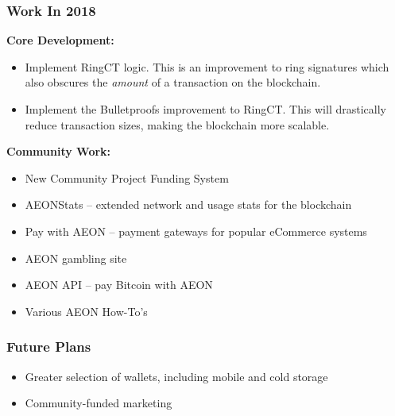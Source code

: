 \subsubsection{Work In 2018}
\textbf{Core Development:}
\begin{itemize}
	\item Implement RingCT logic. This is an improvement to ring signatures which also obscures the \textit{amount} of a transaction on the blockchain.
	\item Implement the Bulletproofs improvement to RingCT. This will drastically reduce transaction sizes, making the blockchain more scalable.
\end{itemize}
\textbf{Community Work:}
\begin{itemize}
	\item New Community Project Funding System
	\item AEONStats -- extended network and usage stats for the blockchain
	\item Pay with AEON -- payment gateways for popular eCommerce systems
	\item AEON gambling site
	\item AEON API -- pay Bitcoin with AEON
	\item Various AEON How-To's
\end{itemize}

\subsubsection{Future Plans}
\begin{itemize}
	\item Greater selection of wallets, including mobile and cold storage
	\item Community-funded marketing
\end{itemize}

